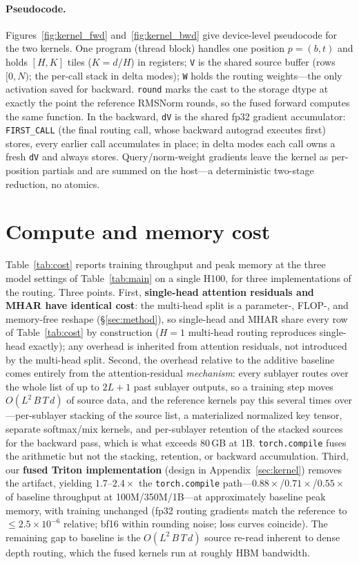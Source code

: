 \documentclass{article}
\begin{document}
\paragraph{Pseudocode.} Figures~\ref{fig:kernel_fwd} and~\ref{fig:kernel_bwd}
give device-level pseudocode for the two kernels. One program (thread block)
handles one position $p=(b,t)$ and holds $[H, K]$ tiles ($K{=}d/H$) in
registers; \texttt{V} is the shared source buffer (rows $[0,N)$; the per-call
stack in delta modes); \texttt{W} holds the routing weights---the only
activation saved for backward. \texttt{round} marks the cast to the storage
dtype at exactly the point the reference RMSNorm rounds, so the fused forward
computes the same function. In the backward, \texttt{dV} is the shared fp32
gradient accumulator: \texttt{FIRST\_CALL} (the final routing call, whose
backward autograd executes first) stores, every earlier call accumulates in
place; in delta modes each call owns a fresh \texttt{dV} and always stores.
Query/norm-weight gradients leave the kernel as per-position partials and are
summed on the host---a deterministic two-stage reduction, no atomics.



\section{Compute and memory cost}
\label{app:cost}
Table~\ref{tab:cost} reports training throughput and peak memory at the three model
settings of Table~\ref{tab:main} on a single H100, for three implementations of the
routing. Three points. First, \textbf{single-head attention residuals and MHAR have
identical cost}: the multi-head split is a parameter-, FLOP-, and memory-free reshape
(\S\ref{sec:method}), so single-head and MHAR share every row of Table~\ref{tab:cost}
by construction ($H{=}1$ multi-head routing reproduces single-head exactly); any
overhead is inherited from attention residuals, not introduced by the multi-head
split. Second, the overhead relative to the additive baseline comes entirely from the
attention-residual \emph{mechanism}: every sublayer routes over the whole list of up
to $2L{+}1$ past sublayer outputs, so a training step moves $O(L^2\,B\,T\,d)$ of
source data, and the reference kernels pay this several times over---per-sublayer
stacking of the source list, a materialized normalized key tensor, separate
softmax/mix kernels, and per-sublayer retention of the stacked sources for the
backward pass, which is what exceeds 80\,GB at 1B. \texttt{torch.compile} fuses the
arithmetic but not the stacking, retention, or backward accumulation. Third, our
\textbf{fused Triton implementation} (design in Appendix~\ref{sec:kernel}) removes
the artifact, yielding $1.7$--$2.4\times$ the \texttt{torch.compile}
path---$0.88\times$/$0.71\times$/$0.55\times$ of baseline throughput at
100M/350M/1B---at approximately baseline peak memory, with training unchanged
(fp32 routing gradients match the reference to $\le 2.5\times10^{-6}$ relative;
bf16 within rounding noise; loss curves coincide). The remaining gap to baseline is
the $O(L^2\,B\,T\,d)$ source re-read inherent to dense depth routing, which the
fused kernels run at roughly HBM bandwidth.
\end{document}
